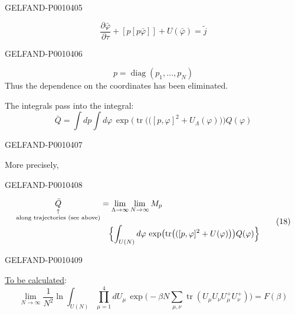 \begin{GelfandAdjacentEvidence}{GELFAND-P001040}{5}


\begin{equation*}
\frac{\partial\bar\varphi}{\partial\tau}
+[p[p\bar\varphi]]+U(\bar\varphi)=\widetilde j
\tag{16}
\end{equation*}
\end{GelfandAdjacentEvidence}
\begin{GelfandAdjacentEvidence}{GELFAND-P001040}{6}


\[
p=\operatorname{diag}(p_1,\ldots,p_N)
\]
Thus the dependence on the coordinates has been eliminated.

The integrals pass into the integral:
\begin{equation*}
\bar Q=\int dp\int d\varphi\,\exp\bigl(\operatorname{tr}\bigl(([p,\varphi]^2+U_\Lambda(\varphi)\bigr)\bigr)Q(\varphi)
\tag{17}
\end{equation*}
\end{GelfandAdjacentEvidence}
\begin{GelfandAdjacentEvidence}{GELFAND-P001040}{7}


More precisely,

\end{GelfandAdjacentEvidence}
\begin{GelfandAdjacentEvidence}{GELFAND-P001040}{8}

\begin{equation*}
\begin{aligned}
\underset{\substack{\uparrow\\\text{along trajectories (see above)}}}{\bar Q}
&=\lim_{\Lambda\to\infty}\lim_{N\to\infty}M_p\\
&\quad\Bigl\{\int_{U(N)}d\varphi\,\exp\bigl(\operatorname{tr}\bigl(([p,\varphi]^2+U(\varphi)\bigr)\bigr)Q(\varphi)\Bigr\}
\end{aligned}
\tag{18}
\end{equation*}
\end{GelfandAdjacentEvidence}
\begin{GelfandAdjacentEvidence}{GELFAND-P001040}{9}


\underline{To be calculated}:
\begin{equation*}
\lim_{N\to\infty}\frac{1}{N^2}\ln
\int_{U(N)}\prod_{\mu=1}^{4}dU_\mu\,
\exp\bigl(-\beta N\sum_{\mu,\nu}\operatorname{tr}(U_\mu U_\nu U_\mu^+U_\nu^+)\bigr)=F(\beta)
\tag{19}
\end{equation*}
\end{GelfandAdjacentEvidence}
